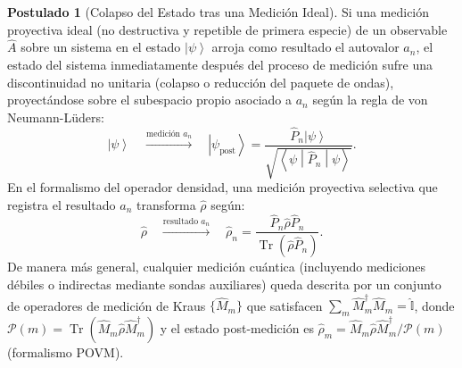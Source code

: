 \documentclass[11pt,a4paper,twoside]{report}
\theoremstyle{definition}
\newtheorem{postulado}{Postulado}[chapter]
\theoremstyle{plain}
\theoremstyle{remark}
\newcommand{\ket}[1]{\left| #1 \right\rangle}
\newcommand{\mel}[3]{\left\langle #1 \middle| #2 \middle| #3 \right\rangle}
\newcommand{\tr}{\operatorname{Tr}}
\newcommand{\op}[1]{\hat{#1}}
\newcommand{\ident}{\hat{\mathbb{I}}}
\begin{document}
\begin{postulado}[Colapso del Estado tras una Medición Ideal]
Si una medición proyectiva ideal (no destructiva y repetible de primera especie) de un observable $\op{A}$ sobre un sistema en el estado $\ket{\psi}$ arroja como resultado el autovalor $a_n$, el estado del sistema inmediatamente después del proceso de medición sufre una discontinuidad no unitaria (colapso o reducción del paquete de ondas), proyectándose sobre el subespacio propio asociado a $a_n$ según la regla de von Neumann-Lüders:
\begin{equation}
    \ket{\psi} \quad \xrightarrow{\text{medición } a_n} \quad \ket{\psi_{\text{post}}} = \frac{\op{P}_n \ket{\psi}}{\sqrt{\mel{\psi}{\op{P}_n}{\psi}}}.
\end{equation}
En el formalismo del operador densidad, una medición proyectiva selectiva que registra el resultado $a_n$ transforma $\op{\rho}$ según:
\begin{equation}
    \op{\rho} \quad \xrightarrow{\text{resultado } a_n} \quad \op{\rho}_n = \frac{\op{P}_n \op{\rho} \op{P}_n}{\tr(\op{\rho}\op{P}_n)}.
\end{equation}
De manera más general, cualquier medición cuántica (incluyendo mediciones débiles o indirectas mediante sondas auxiliares) queda descrita por un conjunto de operadores de medición de Kraus $\{\op{M}_m\}$ que satisfacen $\sum_m \op{M}_m^\dagger \op{M}_m = \ident$, donde $\mathcal{P}(m) = \tr(\op{M}_m \op{\rho} \op{M}_m^\dagger)$ y el estado post-medición es $\op{\rho}_m = \op{M}_m \op{\rho} \op{M}_m^\dagger / \mathcal{P}(m)$ (formalismo POVM).
\end{postulado}
\end{document}
